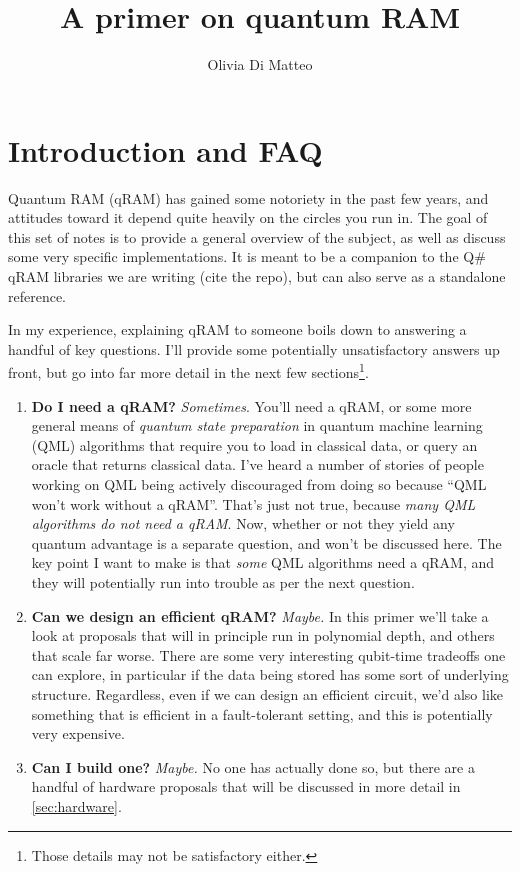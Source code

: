 \documentclass[a4paper,12pt]{article}
\title{A primer on quantum RAM}
\author{Olivia Di Matteo}
\begin{document}
\maketitle

\setcounter{tocdepth}{4}
\setcounter{secnumdepth}{4}
\tableofcontents

\section{Introduction and FAQ}

Quantum RAM (qRAM) has gained some notoriety in the past few years, and attitudes toward it depend quite heavily on the circles you run in. 
The goal of this set of notes is to provide a general overview of the subject, as well as discuss some very specific implementations. 
It is meant to be a companion to the Q\# qRAM libraries we are writing (cite the repo), but can also serve as a standalone reference.


In my experience, explaining qRAM to someone boils down to answering a handful of key questions. 
I'll provide some potentially unsatisfactory answers up front, but go into far more detail in the next few sections\footnote{Those details may not be satisfactory either.}.

\begin{enumerate} 
 \item \textbf{Do I need a qRAM?}
  \emph{Sometimes}. You'll need a qRAM, or some more general means of \emph{quantum state preparation} in quantum machine learning (QML) algorithms that require you to load in classical data, or query an oracle that returns classical data. 
  I've heard a number of stories of people working on QML being actively discouraged from doing so because ``QML won't work without a qRAM''. 
  That's just not true, because \emph{many QML algorithms do not need a qRAM}.
  Now, whether or not they yield any quantum advantage is a separate question, and won't be discussed here. 
  The key point I want to make is that \emph{some} QML algorithms need a qRAM, and they will potentially run into trouble as per the next question.
 \item \textbf{Can we design an efficient qRAM?} \emph{Maybe.} 
 In this primer we'll take a look at proposals that will in principle run in polynomial depth, and others that scale far worse. 
 There are some very interesting qubit-time tradeoffs one can explore, in particular if the data being stored has some sort of underlying structure. 
 Regardless, even if we can design an efficient circuit, we'd also like something that is efficient in a fault-tolerant setting, and this is potentially very expensive.
 \item \textbf{Can I build one?} \emph{Maybe.} No one has actually done so, but there are a handful of hardware proposals that will be discussed in more detail in \autoref{sec:hardware}. 
\end{enumerate}
\end{document}
